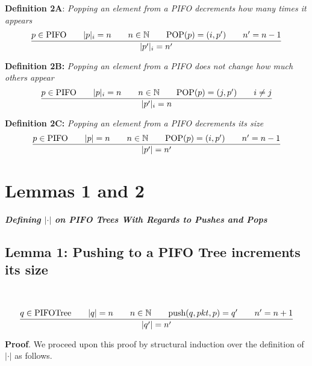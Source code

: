 \documentclass{article}
\begin{document}
\hfill\break

\noindent \textbf{Definition 2A}: \textit{Popping an element from a PIFO decrements how many times it appears}
 $$\frac{p \in \text{PIFO}  \hspace{0.7cm} |p|_i = n \hspace{0.7cm} n \in \mathbb{N} \hspace{0.7cm} \text{POP}(p) = (i, p') \hspace{0.7cm} n' = n-1}{|p'|_i = n'}$$

\noindent \textbf{Definition 2B:} \textit{Popping an element from a PIFO does not change how much others appear}
$$\frac{p \in \text{PIFO}  \hspace{0.7cm} |p|_i = n \hspace{0.7cm} n \in \mathbb{N} \hspace{0.7cm} \text{POP}(p) = (j, p') \hspace{0.7cm} i \neq j}{|p'|_i = n}$$

\noindent \textbf{Definition 2C:} \textit{Popping an element from a PIFO decrements its size}
$$\frac{p \in \text{PIFO}  \hspace{0.7cm} |p| = n \hspace{0.7cm} n \in \mathbb{N} \hspace{0.7cm} \text{POP}(p) = (i, p') \hspace{0.7cm} n' = n-1}{|p'| = n'}$$\newpage

\section{Lemmas 1 and 2}
\noindent \textbf{\textit{Defining $|\cdot|$ on PIFO Trees With Regards to Pushes and Pops}}\newline

\subsection{Lemma 1: Pushing to a PIFO Tree increments its size}

\par\

$$\frac{q \in \text{PIFOTree} \hspace{0.7cm} |q| = n \hspace{0.7cm} n \in \mathbb{N} \hspace{0.7cm} \text{push}(q, pkt, p) = q' \hspace{0.7cm} n' = n+1}{|q'| = n'}$$

\noindent \textbf{Proof}. We proceed upon this proof by structural induction over the definition of $|\cdot|$ as follows.\newline
\end{document}
